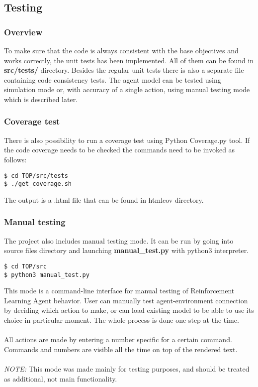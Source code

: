 \documentclass{article}
\begin{document}
\subsection{Testing}
\subsubsection{Overview}
To make sure that the code is always consistent with the base objectives and works correctly, the unit tests has been implemented. All of them can be found in \textbf{src/tests/} directory. Besides the regular unit tests there is also a separate file containing code consistency tests.
	The agent model can be tested using simulation mode or, with accuracy of a single action, using manual testing mode which is described later.

\subsubsection{Coverage test}
There is also possibility to run a coverage test using Python Coverage.py tool. If the code coverage needs to be checked the commands need to be invoked as follows:
\begin{lstlisting}
$ cd TOP/src/tests
$ ./get_coverage.sh
\end{lstlisting}
The output is a .html file that can be found in htmlcov directory.

\subsubsection{Manual testing}
The project also includes manual testing mode. It can be run by going into source files directory and launching \textbf{manual\_test.py} with python3 interpreter. 
\begin{lstlisting}
$ cd TOP/src
$ python3 manual_test.py
\end{lstlisting}
This mode is a command-line interface for manual testing of Reinforcement Learning Agent behavior. User can manually test agent-environment connection by deciding which action to make, or can load existing model to be able to use its choice in particular moment. The whole process is done one step at the time.\\\\
All actions are made by entering a number specific for a certain command. Commands and numbers are visible all the time on top of the rendered text. \\\\
\textit{NOTE:} This mode was made mainly for testing purposes, and should be treated as additional, not main functionality.
\end{document}
